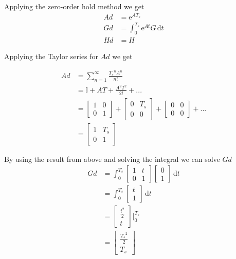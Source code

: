 Applying the zero-order hold method we get
\begin{equation}
\begin{split}
    Ad & = \mathrm{e}^{AT_s} \\
    Gd & = \int_0^{T_s} \mathrm{e}^{At} G \,\mathrm{d}t \\
    Hd & = H
\end{split}
\end{equation}

Applying the Taylor series for $Ad$ we get

\begin{equation}
\begin{split}
    Ad & = \displaystyle\sum_{n=1}^{\infty} \frac{{T_s}^n A^n}{n!} \\
    & = \mathbb{I} + AT + \frac{A^2 T^2}{2!} + ...\\
    & = \begin{bmatrix}1 & 0 \\ 0 & 1 \end{bmatrix} + \begin{bmatrix}0 & T_s \\ 0 & 0 \end{bmatrix} + \begin{bmatrix}0 & 0 \\ 0 & 0 \end{bmatrix} + ... \\
    & = \begin{bmatrix}1 & T_s \\ 0 & 1 \end{bmatrix}
\end{split}
\end{equation}

By using the result from above and solving the integral we can solve $Gd$
\begin{equation}
\begin{split}
    Gd & = \int_0^{T_s} \begin{bmatrix}1 & t\\ 0 & 1 \end{bmatrix} \begin{bmatrix}0 \\ 1 \end{bmatrix} \,\mathrm{d}t \\
    & = \int_0^{T_s} \begin{bmatrix} t \\ 1 \end{bmatrix} \,\mathrm{d}t \\
    & = \begin{bmatrix} \frac{t^2}{2} \\ t \end{bmatrix} \bigg|_0^{T_s} \\
    & = \begin{bmatrix} \frac{{T_s}^2}{2} \\ {T_s} \end{bmatrix}
\end{split}
\end{equation}

